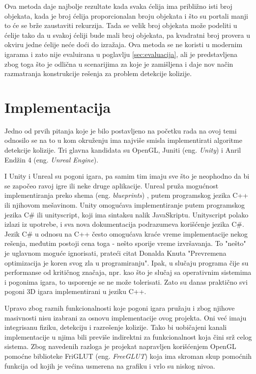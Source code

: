 \documentclass[12pt,oneside]{memoir}
\begin{document}
Ova metoda daje najbolje rezultate kada svaka ćelija ima približno isti broj objekata, kada je 
broj ćelija proporcionalan broju objekata i što su portali manji to će se brže zaustaviti rekurzija.
Tada se velik broj objekata može podeliti u ćelije tako da u svakoj ćeliji bude mali broj objekata,
pa kvadratni broj provera u okviru jedne ćelije neće doći do izražaja.
Ova metoda se ne koristi u modernim igarama i zato nije evaluirana u poglavlju \ref{sec:evaluacija},
ali je predstavljena zbog toga što je odlična u scenarijima za
koje je zamišljena i daje nov način razmatranja konstrukcije rešenja za problem detekcije kolizije.

\chapter{Implementacija}
\label{sec:implementacija}

Jedno od prvih pitanja koje je bilo postavljeno na početku rada na ovoj temi odnosilo se na to 
u kom okruženju ima najviše smisla implementirati algoritme detekcije kolizije.
Tri glavna kandidata su OpenGL, Juniti (eng. {\em Unity}) i Anril Endžin 4 (eng. {\em Unreal Engine}).

I Unity i Unreal su pogoni igara, pa samim tim imaju sve što je neophodno da 
bi se započeo ravoj igre ili neke druge aplikacije.
Unreal pruža mogućnost implementiranja preko shema (eng. {\em blueprints})
, putem programskog jezika C++ ili njihovom mešavinom.
Unity omogućava implementiranje putem programskog jezika C\# ili unityscript,
koji ima sintaksu nalik JavaSkriptu. Unityscript polako izlazi iz upotrebe, i 
sva nova dokumentacija podrazumeva korišćenje jezika C\#.
Jezik C\# u odnosu na C++ često omogućava kraće vreme implementacije nekog rešenja,
međutim postoji cena toga - nešto sporije vreme izvršavanja.
To "nešto" je uglavnom moguće ignorisati, prateći citat Donalda Knuta 
"Prevremena optimizacija je koren svog zla u programiranju".
Ipak, u slučaju programa čije su performanse od kritičnog značaja, npr. kao što je 
slučaj sa operativnim sistemima i pogonima igara, to usporenje se ne može tolerisati.
Zato su danas praktično svi pogoni 3D igara implementirani u jeziku C++.

Upravo zbog raznih funkcionalnosti koje pogoni igara pružaju i zbog njihove masivnosti nisu izabrani
za osnovu implementacije ovog projekta. Oni već imaju integrisanu fiziku, detekciju 
i razrešenje kolizije. Tako bi uobičajeni kanali implementacije u njima 
bili previše indirektni za funkcionalnost koja čini srž celog sistema.
Zbog navedenih razloga je projekat napravljen korišćenjem OpenGL pomoćne 
biblioteke FriGLUT (eng. {\em FreeGLUT}) koja ima skroman skup pomoćnih
funkcija od kojih je većina usmerena na grafiku i vrlo su niskog nivoa.
\end{document}
